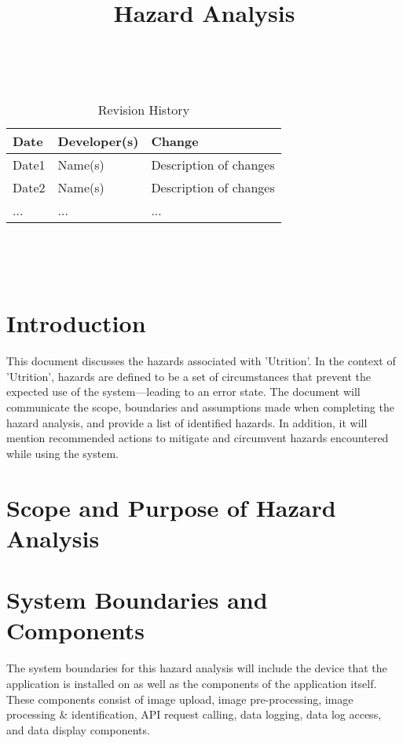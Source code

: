 \documentclass{article}
\title{Hazard Analysis\\\progname}
\author{\authname}
\date{}
\begin{document}
	
\maketitle
\thispagestyle{empty}

~\newpage


\begin{table}[hp]
	\caption{Revision History} \label{TblRevisionHistory}
	\begin{tabularx}{\textwidth}{llX}
		\toprule
		\textbf{Date} & \textbf{Developer(s)} & \textbf{Change}\\
		\midrule
		Date1 & Name(s) & Description of changes\\
		Date2 & Name(s) & Description of changes\\
		... & ... & ...\\
		\bottomrule
	\end{tabularx}
\end{table}

~\newpage

\tableofcontents

~\newpage



\section{Introduction}

This document discusses the hazards associated with 'Utrition'. In the context 
of 'Utrition', hazards are defined to be a set of circumstances that prevent 
the expected use of the system---leading to an error state. The document will 
communicate the scope, boundaries and assumptions made when completing the 
hazard analysis, and provide a list of identified hazards. In addition, it will 
mention recommended actions to mitigate and circumvent hazards encountered 
while using the system.

\section{Scope and Purpose of Hazard Analysis}

\section{System Boundaries and Components}
The system boundaries for this hazard analysis will include the device that the application is installed on as well as the components of the application itself. These components consist of image upload, image pre-processing, image processing \& identification, API request calling, data logging, data log access, and data display components.
\end{document}
